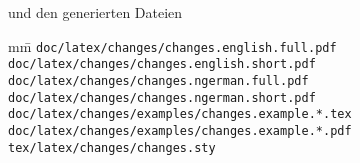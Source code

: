 und den generierten Dateien

\begin{tabbing}
	mm\=\kill
	\>\texttt{doc/latex/changes/changes.english.full.pdf}\\
	\>\texttt{doc/latex/changes/changes.english.short.pdf}\\
	\>\texttt{doc/latex/changes/changes.ngerman.full.pdf}\\
	\>\texttt{doc/latex/changes/changes.ngerman.short.pdf}\\

	\>\texttt{doc/latex/changes/examples/changes.example.*.tex}\\
	\>\texttt{doc/latex/changes/examples/changes.example.*.pdf}\\

	\>\texttt{tex/latex/changes/changes.sty}
\end{tabbing}


